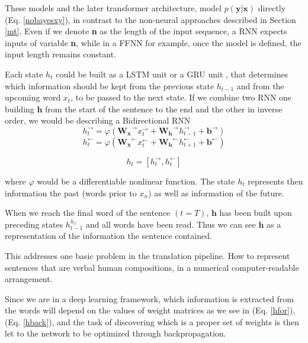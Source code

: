 \documentclass[11pt,english,listoffigures,listoftables]{tfgetsinf}
\newcommand{\vect}[1]{\mathbf{#1}}
\begin{document}
These models and the later transformer  architecture, model $p(\vect{y}|\vect{x})$ directly (Eq. \ref{nobayesxy}), in contrast to the non-neural approaches described in Section \ref{mt}. Even if we denote \textbf{n} as the length of the input sequence, a RNN expects inputs of variable \textbf{n}, while in a FFNN for example, once the model is defined, the input length remains constant.

Each state $h_t$ could be built as a LSTM unit \cite{hochreiter1997long} or a GRU unit \cite{cho-etal-2014-learning}, that determines which information should be kept from the previous state $h_{t-1}$ and from the upcoming word $x_t$, to be passed to the next state. If we combine two RNN  one building $\vect{h}$ from the start of the sentence to the end and the other in inverse order, we would be describing a Bidirectional RNN
\begin{equation}\label{hfor}
    h_t^\rightarrow = \varphi (\vect{W_x}^\rightarrow x_t^\rightarrow + \vect{W_h}^\rightarrow h_{t-1}^\rightarrow + \vect{b}^\rightarrow )
\end{equation}
\begin{equation}\label{hback}
    h_t^\leftarrow = \varphi (\vect{W_x}^\leftarrow x_t^\leftarrow + \vect{W_h}^\leftarrow h_{t+1}^\leftarrow + \vect{b}^\leftarrow )
\end{equation}

\begin{equation}
h_t = [h_t^\rightarrow, h_t^\leftarrow]
\end{equation}

where $\varphi$ would be a differentiable nonlinear function. 
The state $h_t$ represents then information the past (words prior to $x_n$) as well as information of the future.

When we reach the final word of the sentence $(t=T)$, $\vect{h}$ has been built upon preceding states $h_{t-1}^{h_1}$ and all words have been read. Thus we can see $\vect{h}$ as a representation of the information the sentence contained.

This addresses one basic problem in the translation pipeline. How to represent sentences that are verbal human compositions, in a numerical computer-readable arrangement.

Since we are in a deep learning framework, which information is extracted from the words will depend on the values of weight matrices as we see in (Eq. \ref{hfor}), (Eq. \ref{hback}), and the task of discovering which is a proper set of weights is then let to the network to be optimized through backpropagation.
\end{document}
